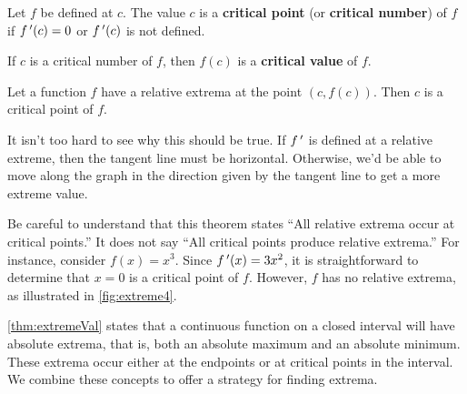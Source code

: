 \begin{definition}\label{def:criticalnum}%
Let $f$ be defined at $c$. The value $c$ is a \textbf{critical point} (or \textbf{critical number}) of $f$ if $f\,'(c)=0$ or $f\,'(c)$ is not defined.\bigskip

If $c$ is a critical number of $f$, then $f(c)$ is a \textbf{critical value} of $f$.
\end{definition}

\begin{theorem}\label{thm:criticalpts}%
Let a function $f$ have a relative extrema at the point $(c,f(c))$. Then $c$ is a critical point of $f$.
\end{theorem}%

It isn't too hard to see why this should be true.  If $f\,'$ is defined at a relative extreme, then the tangent line must be horizontal.  Otherwise, we'd be able to move along the graph in the direction given by the tangent line to get a more extreme value.


Be careful to understand that this theorem states  ``All relative extrema occur at critical points.'' It does not say ``All critical points produce relative extrema.'' For instance, consider $f(x) = x^3$. Since $f\,'(x) = 3x^2$, it is straightforward to determine that $x=0$ is a critical point of $f$. However, $f$ has no relative extrema, as illustrated in \autoref{fig:extreme4}.\bigskip

\autoref{thm:extremeVal} states that a continuous function on a closed interval will have absolute extrema, that is, both an absolute maximum and an absolute minimum. These extrema occur either at the endpoints or at critical points in the interval. We combine these concepts to offer a strategy for finding extrema.

